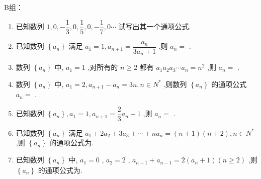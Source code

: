B组：
\begin{enumerate}

    \item 已知数列 $1,0, - \dfrac{1}{3},0,\dfrac{1}{5},0, - \dfrac{1}{7},0\cdots$ 试写出其一个通项公式.

    \item 已知数列 $\left\{  {a}_{n}\right\}$ 满足 ${a}_{1} = 1,{a}_{n + 1} = \dfrac{{a}_{n}}{3{a}_{n} + 1}$ ,则 ${a}_{n} =$ .

    \item 数列 $\left\{  {a}_{n}\right\}$ 中, ${a}_{1} = 1$ ,对所有的 $n \geq  2$ 都有 ${a}_{1}{a}_{2}{a}_{3}\cdots {a}_{n} = {n}^{2}$ ,则 ${a}_{n} =$ .

    \item 数列 $\left\{  {a}_{n}\right\}$ 中, ${a}_{1} = 2,{a}_{n + 1} - {a}_{n} = {3n},n \in  {N}^{ * }$ ,则数列 $\left\{  {a}_{n}\right\}$ 的通项公式 ${a}_{n} =$ .

    \item 已知数列 $\left\{  {a}_{n}\right\}  ,{a}_{1} = 1,{a}_{n + 1} = \dfrac{2}{3}{a}_{n} + 1$ ,则 ${a}_{n} =$ .

    \item 已知数列 $\left\{  {a}_{n}\right\}$ 满足 ${a}_{1} + 2{a}_{2} + 3{a}_{3} + \cdots  + n{a}_{n} = \left( {n + 1}\right) \left( {n + 2}\right) ,n \in  {N}^{ * }$ ,则 $\left\{  {a}_{n}\right\}$ 的通项公式为. 
    
    \item 已知数列 $\left\{  {a}_{n}\right\}$ 中, ${a}_{1} = 0$ , ${a}_{2} = 2$ , ${a}_{n + 1} + {a}_{n - 1} = 2\left( {{a}_{n} + 1}\right) \left( {n \geq  2}\right)$ ,则 $\left\{  {a}_{n}\right\}$ 的通项公式为. 


\end{enumerate}
